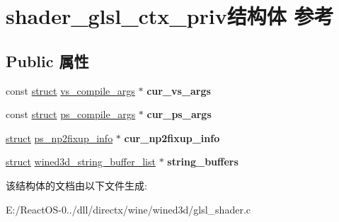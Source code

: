 \hypertarget{structshader__glsl__ctx__priv}{}\section{shader\+\_\+glsl\+\_\+ctx\+\_\+priv结构体 参考}
\label{structshader__glsl__ctx__priv}
\subsection*{Public 属性}
\begin{DoxyCompactItemize}
\item 
\mbox{\label{structshader__glsl__ctx__priv_a17c99c14013d674b6671c119e853163b}} 
const \hyperlink{interfacestruct}{struct} \hyperlink{structvs__compile__args}{vs\+\_\+compile\+\_\+args} $\ast$ {\bfseries cur\+\_\+vs\+\_\+args}
\item 
\mbox{\label{structshader__glsl__ctx__priv_a70a5e81cefd5206b2ca2ea66d101062f}} 
const \hyperlink{interfacestruct}{struct} \hyperlink{structps__compile__args}{ps\+\_\+compile\+\_\+args} $\ast$ {\bfseries cur\+\_\+ps\+\_\+args}
\item 
\mbox{\label{structshader__glsl__ctx__priv_a416ce86652580e1167dac14c58fe8d89}} 
\hyperlink{interfacestruct}{struct} \hyperlink{structps__np2fixup__info}{ps\+\_\+np2fixup\+\_\+info} $\ast$ {\bfseries cur\+\_\+np2fixup\+\_\+info}
\item 
\mbox{\label{structshader__glsl__ctx__priv_af72886c2a0ae74f2d1263f79db580368}} 
\hyperlink{interfacestruct}{struct} \hyperlink{structwined3d__string__buffer__list}{wined3d\+\_\+string\+\_\+buffer\+\_\+list} $\ast$ {\bfseries string\+\_\+buffers}
\end{DoxyCompactItemize}


该结构体的文档由以下文件生成\+:\begin{DoxyCompactItemize}
\item 
E\+:/\+React\+O\+S-\/0../dll/directx/wine/wined3d/glsl\+\_\+shader.\+c\end{DoxyCompactItemize}
